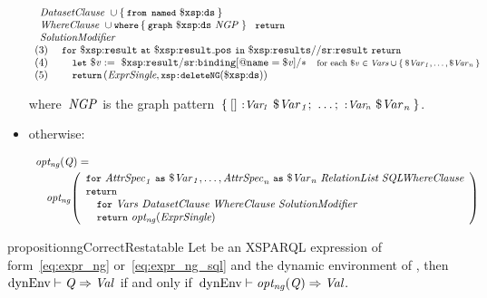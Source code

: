 \begin{itemize}
\begin{small}
\begin{equation*}
\begin{array}{l}
{\begin{array}{l}
                      \DatasetClause~\cup \set{ \FROMNAMED~\varR{ds} }\\
                      \SparqlWhereClause~\cup \WHERE\set{ \keyword{graph}~\varR{ds}~\envElem{NGP}{} } \\
                      \SolutionModifier
                    \end{array}}~\RETURN\\
    \mathrm{(3)~~~~} \FOR~\varR{result}~\AT~\varR{result\mathunderscore{}pos}~\IN~\varR{results//sr{:}result}~\RETURN \\
    \mathrm{(4)~~~~} \quad \LET~\var{v} :=~ \varR{result/sr{:}binding[@name = \var{v}]/*} \hfill \quad \textrm{\smaller for each \var{v}~$\in \Vars \cup \set{\envElem{\var{Var}}{1}, \dots, \envElem{\var{Var}}{n}}$}\\
    \mathrm{(5)~~~~}\quad\RETURN \left(\ExprSingle, \funcCallR{deleteNG}{\varR{ds}}\right)
\end{array}
\end{equation*}
\end{small}%
%
where~$\mathit{{NGP}_{}}$ is the graph pattern~$\left\{\: \mathtt{[]}~\mbox{\small$\mathtt{{:}\mathit{{Var\!}_{1}}}$}~\mathit{{\$\mathit{Var}}_{1}} ;~ \dots ;~\mbox{\small$\mathtt{{:}\mathit{{Var\!}_{n}}}$}~\mathit{{\$\mathit{Var}}_{n}} \:\right\}$.
%
\item otherwise:
%
\begin{small}
\begin{equation*}
\begin{array}{r@{~~~}l}
  \multicolumn{2}{l}{\funcCall{opt_{ng}}{\envElem{Q}{}} =}\\[.3em]
  & \ong{\begin{array}{l}
      \FOR~\envElem{AttrSpec}{1}~\keyword{as}~\envElem{\var{Var}}{1}, \dots, \envElem{AttrSpec}{n}~\keyword{as}~\envElem{\var{Var}}{n}~\grammarRule{RelationList}~\grammarRule{SQLWhereClause}\\
      \RETURN \\
      \quad\FOR~\Vars~\DatasetClause~\SparqlWhereClause~\SolutionModifier\\
      \quad\RETURN~\ong{\ExprSingle}
  \end{array}
}
 \end{array}
\end{equation*}
\end{small}%
\end{itemize}



\begin{restatable}{proposition}{ngCorrectRestatable}
  \label{prop:ng-correct}
  Let  be an XSPARQL expression of form~\eqref{eq:expr_ng} or~\eqref{eq:expr_ng_sql} and \dyn the dynamic
  environment of , then~${\textrm{dynEnv}} \vdash \mathit{{Q}_{}} \Rightarrow \mathit{{Val}_{}}$ if and only if~${\textrm{dynEnv}} \vdash \mathit{opt_{ng}}\!\left(\mathit{{Q}_{}}\right) \Rightarrow \mathit{{Val}_{}}.$
\end{restatable}
%



